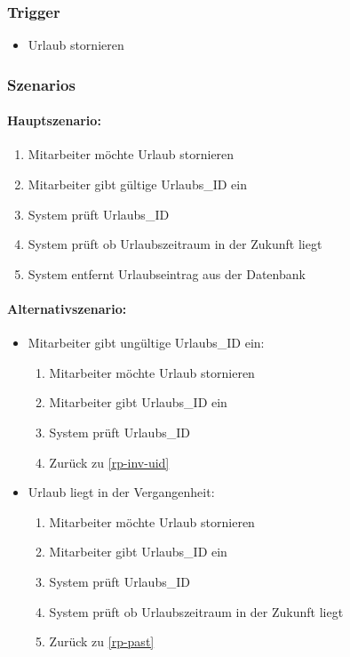 \subsubsection{Trigger}
\begin{itemize}
    \item Urlaub stornieren
\end{itemize}

\subsubsection{Szenarios}
\paragraph{Hauptszenario:}

\begin{enumerate}
    \item Mitarbeiter möchte Urlaub stornieren
	\item Mitarbeiter gibt gültige Urlaubs\_ID ein
	\item System prüft Urlaubs\_ID
	\item System prüft ob Urlaubszeitraum in der Zukunft liegt
	\item System entfernt Urlaubseintrag aus der Datenbank
\end{enumerate}

\paragraph{Alternativszenario:}

\begin{itemize}
    \item Mitarbeiter gibt ungültige Urlaubs\_ID ein:
    \begin{enumerate}
    	\item Mitarbeiter möchte Urlaub stornieren
    	\item Mitarbeiter gibt Urlaubs\_ID ein \label{rp-inv-uid}
    	\item System prüft Urlaubs\_ID
    	\item Zurück zu \ref{rp-inv-uid}
    \end{enumerate}
    
    \item Urlaub liegt in der Vergangenheit:
     \begin{enumerate}
    	\item Mitarbeiter möchte Urlaub stornieren
    	\item Mitarbeiter gibt Urlaubs\_ID ein \label{rp-past}
    	\item System prüft Urlaubs\_ID
    	\item System prüft ob Urlaubszeitraum in der Zukunft liegt
    	\item Zurück zu \ref{rp-past}
    \end{enumerate}   
\end{itemize}

